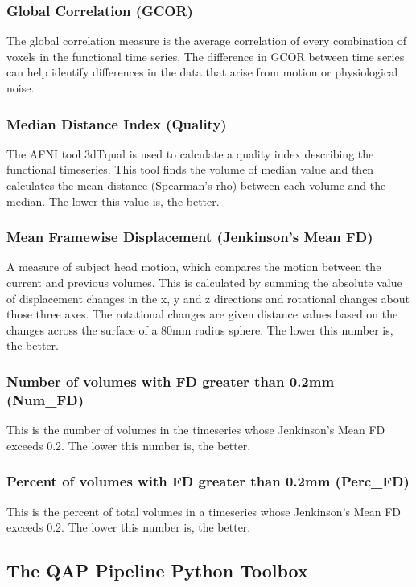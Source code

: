 \subsubsection{Global Correlation (GCOR)}
\label{sec:14}
The global correlation measure is the average correlation of every combination of voxels in the functional time series. The difference in GCOR between time series can help identify differences in the data that arise from motion or physiological noise.
\subsubsection{Median Distance Index (Quality)}
\label{sec:15}
The AFNI tool 3dTqual is used to calculate a quality index describing the functional timeseries. This tool finds the volume of median value and then calculates the mean distance (Spearman’s rho) between each volume and the median. The lower this value is, the better.
\subsubsection{Mean Framewise Displacement (Jenkinson’s Mean FD)}
\label{sec:16}
A measure of subject head motion, which compares the motion between the current and previous volumes. This is calculated by summing the absolute value of displacement changes in the x, y and z directions and rotational changes about those three axes. The rotational changes are given distance values based on the changes across the surface of a 80mm radius sphere. The lower this number is, the better.
\subsubsection{Number of volumes with FD greater than 0.2mm (Num_FD)}
\label{sec:17}
This is the number of volumes in the timeseries whose Jenkinson’s Mean FD exceeds 0.2. The lower this number is, the better.
\subsubsection{Percent of volumes with FD greater than 0.2mm (Perc_FD)}
\label{sec:18}
This is the percent of total volumes in a timeseries whose Jenkinson’s Mean FD exceeds 0.2. The lower this number is, the better.
\subsection{The QAP Pipeline Python Toolbox}
\label{sec:19}
